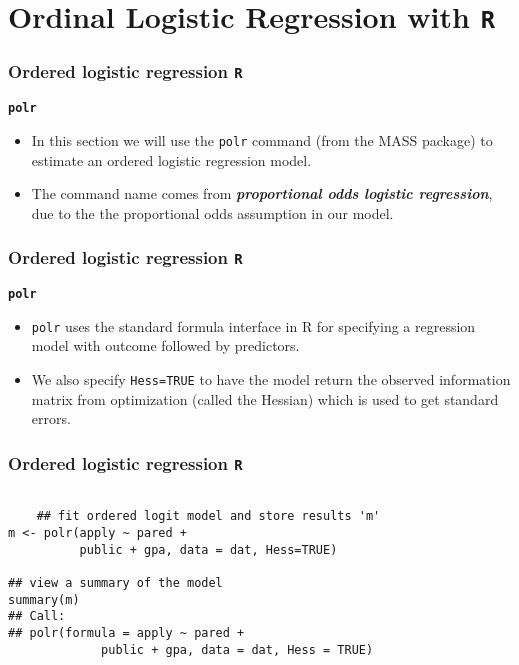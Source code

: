 \documentclass[00-GLMregslides.tex]{subfiles}
\begin{document}
\newpage
\Large

\section{Ordinal Logistic Regression with \texttt{R}}


\begin{frame}[fragile]
	\frametitle{Ordered logistic regression \texttt{R} }
	\Large
\textbf{\texttt{polr}}
\begin{itemize}
\item In this section we will use the \texttt{polr} command (from the MASS package) to estimate an ordered logistic 
regression model. 
\item The command name comes from \textbf{\textit{proportional odds logistic regression}}, due to the the proportional odds assumption in our model. 
\end{itemize}
\end{frame}
\begin{frame}[fragile]
	\frametitle{Ordered logistic regression \texttt{R} }
	\Large
\textbf{\texttt{polr}}
\begin{itemize}
\item \texttt{polr} uses the standard formula interface in R for specifying a regression model with outcome 
followed by predictors. 
\item We also specify \texttt{Hess=TRUE} to have the model return the observed information matrix from optimization (called the Hessian) which is used to get standard errors.
\end{itemize}
\end{frame}
\begin{frame}[fragile]
	\frametitle{Ordered logistic regression \texttt{R} }
	\large
\begin{framed}		
	\begin{verbatim}
	
	## fit ordered logit model and store results 'm'
m <- polr(apply ~ pared + 
          public + gpa, data = dat, Hess=TRUE)

## view a summary of the model
summary(m)
## Call:
## polr(formula = apply ~ pared + 
             public + gpa, data = dat, Hess = TRUE)
\end{verbatim}
\end{framed}
\end{frame}
\end{document}
